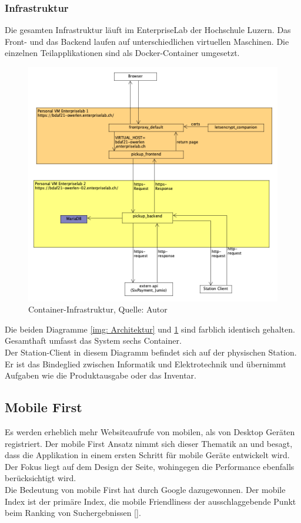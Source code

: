 \subsubsection{Infrastruktur}
Die gesamten Infrastruktur läuft im \gls{EnterpriseLab} der Hochschule Luzern. Das Front- und das Backend laufen auf unterschiedlichen virtuellen Maschinen. Die einzelnen Teilapplikationen sind als Docker-Container umgesetzt. 
\begin{figure}[H]
	\centering
	\includegraphics[width=\linewidth]{images/system.png}
	\caption[Container-Infrastruktur]{Container-Infrastruktur, Quelle: Autor}
	\label{img: Containerinfrastruktur}
\end{figure}
\newpage
Die beiden Diagramme \ref{img: Architektur} und \ref{img: Containerinfrastruktur} sind farblich identisch gehalten. 
Gesamthaft umfasst das System sechs Container.\\
Der Station-Client in diesem Diagramm befindet sich auf der physischen Station. Er ist das Bindeglied zwischen Informatik und Elektrotechnik und übernimmt Aufgaben wie die Produktausgabe oder das Inventar. 

\subsection{Mobile First}
Es werden erheblich mehr Websiteaufrufe von mobilen, als von Desktop Geräten registriert. Der mobile First Ansatz nimmt sich dieser Thematik an und besagt, dass die Applikation in einem ersten Schritt für mobile Geräte entwickelt wird. Der Fokus liegt auf dem Design der Seite, wohingegen die Performance ebenfalls berücksichtigt wird.\\
Die Bedeutung von mobile First hat durch Google dazugewonnen. Der mobile Index ist der primäre Index, die mobile Friendliness der ausschlaggebende Punkt beim Ranking von Suchergebnissen [\cite{mobileFirst}]. 
